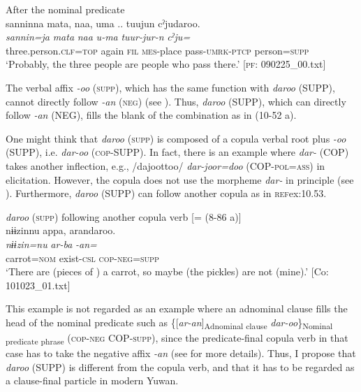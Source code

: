   \ex After the nominal predicate\\
      \glll    {\textbar}sannin{\textbar}na  mata,  naa,  uma ..  tuujun  cˀjudaroo.\\
    \textit{sannin=ja}  \textit{mata}  \textit{naa}  \textit{u-ma}  \textit{tuur-jur-n} \textit{cˀju=}\\
    three.person.\textsc{clf}=\textsc{top}  again  \textsc{fil}  \textsc{mes}-place  pass-\textsc{umrk}-\textsc{ptcp}  person=\textsc{supp}  \\
    \glt     ‘Probably, the three people are people who pass there.’   [\textsc{pf}: 090225\_00.txt]
\z
\z

The verbal affix \textit{{}-oo} (\textsc{supp}), which has the same function with \textit{daroo} (SUPP), cannot directly follow \textit{{}-an} (\textsc{neg}) (see ). Thus, \textit{daroo} (SUPP), which can directly follow \textit{-an} (NEG), fills the blank of the combination as in (10-52 a).

  One might think that \textit{daroo} (\textsc{supp}) is composed of a copula verbal root plus \textit{{}-oo} (SUPP), i.e. \textit{dar-oo} (\textsc{cop}-SUPP). In fact, there is an example where \textit{dar-} (COP) takes another inflection, e.g., /dajoottoo/ \textit{dar-joor=doo} (COP-\textsc{pol}=\textsc{ass}) in elicitation. However, the copula does not use the morpheme \textit{dar-} in principle (see ). Furthermore, \textit{daroo} (SUPP) can follow another copula as in \textsc{ref}{ex:10.53}.

\ea\label{ex:10.53}   \textit{daroo} (\textsc{supp}) following another copula verb [= (8-86 a)]\\
      \glll    nɨɨzinnu  appa,  arandaroo.\\
    \textit{nɨɨzin=nu}  \textit{ar-ba}  \textit{-an=}\\
    carrot=\textsc{nom}  exist-\textsc{csl}  \textsc{cop}-\textsc{neg}=\textsc{supp}\\
\glt     ‘There are (pieces of ) a carrot, so maybe (the pickles) are not (mine).’  [Co: 101023\_01.txt]
\z

This example is not regarded as an example where an adnominal clause fills the head of the nominal predicate such as \{[\textit{ar-an}]\textsubscript{Adnominal clause} \textit{dar-oo}\}\textsubscript{Nominal predicate phrase} (\textsc{cop}-\textsc{neg} COP-\textsc{supp}), since the predicate-final copula verb in that case has to take the negative affix \textit{-an} (see  for more details). Thus, I propose that \textit{daroo} (SUPP) is different from the copula verb, and that it has to be regarded as a clause-final particle in modern Yuwan.

